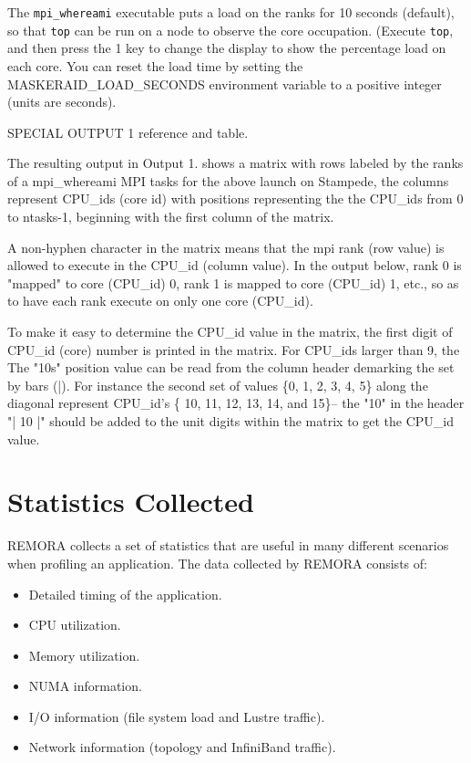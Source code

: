 \documentclass[10pt,a4paper]{report}
\begin{document}
The \verb+mpi_whereami+ executable puts a load on the ranks for 10 seconds (default), 
so that \verb+top+ can be run on
a node to observe the core occupation.  (Execute \verb+top+, and then press the
1 key to change the display to show the percentage load on each core.  You can
reset the load time by setting the MASKERAID\_LOAD\_SECONDS environment
variable to a positive integer (units are seconds).

SPECIAL OUTPUT 1  reference and table.

The resulting output in Output 1. shows a matrix with rows labeled by the ranks
of a mpi\_whereami MPI tasks for the above launch on Stampede, the columns represent 
CPU\_ids (core id) with positions representing the the CPU\_ids from 0 to ntasks-1, 
beginning with the first column of the matrix.

A non-hyphen character in the matrix means that
the mpi rank (row value) is allowed to execute in the CPU\_id (column value). In the
output below,
rank 0 is "mapped" to core (CPU\_id) 0, rank 1 is mapped to
core (CPU\_id) 1, etc., so as to have each rank execute on only one core (CPU\_id).

To make it easy to determine the CPU\_id value in the matrix, the first digit of
CPU\_id (core) number is printed in the matrix.  For CPU\_ids larger than 9, the
The "10s" position value can be read from the column header demarking the set
by bars (|). For instance the second set of values \{0, 1, 2, 3, 4, 5\} along the
diagonal represent CPU\_id's \{ 10, 11, 12, 13, 14, and 15\}-- the "10" in the header
"|       10     |" should be added to the unit digits within the matrix to get the
CPU\_id value.


\section{Statistics Collected}
REMORA collects a set of statistics that are useful in many different scenarios when profiling an application. The data collected by REMORA consists of:

\begin{itemize}
\item Detailed timing of the application.
\item CPU utilization.
\item Memory utilization.
\item NUMA information.
\item I/O information (file system load and Lustre traffic).
\item Network information (topology and InfiniBand traffic).
\end{itemize}
\end{document}
